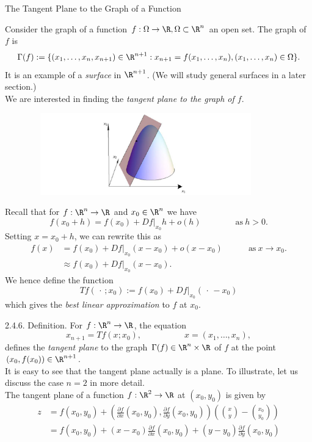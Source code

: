 \documentclass[smaller,hyperref={CJKbookmarks=true}]{beamer}
\begin{document}
\begin{frame}{The Tangent Plane to the Graph of a Function}
\begin{spacing}{0.85}
Consider the graph of a function $f:\Omega\to\R,\Omega\subset\R^n$ an open set. The graph of $f$ is
\[\Gamma(f):=\{(x_1,\ldots,x_n,x_{n+1})\in
\R^{n+1}:x_{n+1}=f(x_1,\ldots,x_n),(x_1,\ldots,
x_n)\in\Omega\}.\]
It is an example of a \emph{surface} in $\R^{n+1}$. (We will study general surfaces in a later section.)\\[5pt]
We are interested in finding the \emph{tangent plane to the graph of $f$}.
\begin{figure}[H]
  \centering
  \includegraphics[width=0.9\textwidth,height=100pt]{53.jpg}

\end{figure}
\newpage
\vspace*{18pt}
Recall that for $f:\R^n\to\R$ and $x_0\in\R^n$ we have
\[f(x_0+h)=f(x_0)+Df|_{x_0}h+o(h)\qquad\qquad
\text{as}~h>0.\]
Setting $x=x_0+h$, we can rewrite this as
\begin{equation*}
  \begin{split}
     f(x) &=f(x_0)+Df|_{x_0}(x-x_0)+o(x-x_0)\qquad\quad\text{as}~
     x\to x_0. \\
       &\approx f(x_0)+Df|_{x_0}(x-x_0).
  \end{split}
\end{equation*}
We hence define the function
\[Tf(\,\cdot\,;x_0):=f(x_0)+Df|_{x_0}(\,\cdot\,-x_0)\]
which gives the \emph{best linear approximation} to $f$ at $x_0$.
\end{spacing}
\newpage
\begin{spacing}{1.2}
\alert{2.4.6. Definition.} For $f:\R^n\to\R$, the equation
\[x_{n+1}=Tf(x;x_0),\qquad\qquad\quad
x=(x_1,\ldots,x_n),\]
defines the \emph{tangent plane} to the graph $\Gamma(f)\in\R^n\times\R$ of $f$ at the point $(x_0,f(x_0))\in\R^{n+1}$.\\[5pt]
It is easy to see that the tangent plane actually is a plane. To illustrate, let
us discuss the case $n = 2$ in more detail.\\[5pt]
The tangent plane of a function $f:\R^2\to\R$ at $(x_0,y_0)$ is given by
\begin{equation}\label{2.4.5}
  \begin{split}
     z &=f(x_0,y_0)+\left(\frac{\partial f}{\partial x}(x_0,y_0),\frac{\partial f}{\partial y}(x_0,y_0)\right)\left(\binom{x}{y}
     -\binom{x_0}{y_0}\right)  \\
       &=f(x_0,y_0)+(x-x_0)\frac{\partial f}{\partial x}(x_0,y_0)+(y-y_0)\frac{\partial f}{\partial y}(x_0,y_0)
  \end{split}
\end{equation}
\end{spacing}
\end{frame}
\end{document}
